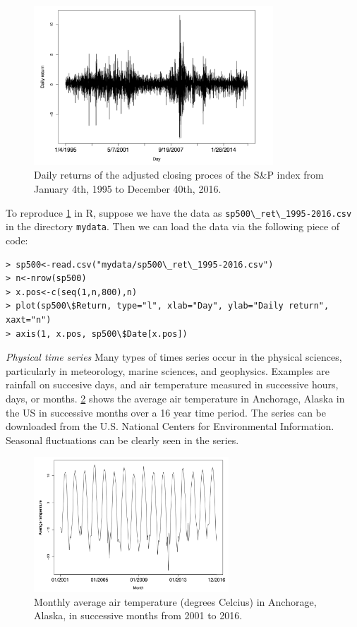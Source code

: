 \begin{figure}[ht]
	\centering
	\includegraphics[width=0.8\textwidth]{Chapter 1/fig1-2.png}
	\caption{Daily returns of the adjusted closing proces of the S\&P index from January 4th, 1995 to December 40th, 2016.}
	\label{fig:1.2}
\end{figure}

To reproduce \cref{fig:1.2} in R, suppose we have the data as \lstinline{sp500\_ret\_1995-2016.csv} in the directory \lstinline{mydata}. Then we can load the data via the following piece of code:

\begin{verbatim}
> sp500<-read.csv("mydata/sp500\_ret\_1995-2016.csv")
> n<-nrow(sp500)
> x.pos<-c(seq(1,n,800),n)
> plot(sp500\$Return, type="l", xlab="Day", ylab="Daily return", xaxt="n")
> axis(1, x.pos, sp500\$Date[x.pos])
\end{verbatim}

\textit{Physical time series}
Many types of times series occur in the physical sciences, particularly in meteorology, marine sciences, and geophysics. Examples are rainfall on succesive days, and air temperature measured in successive hours, days, or months. \cref{fig:1.3} shows the average air temperature in Anchorage, Alaska in the US in successive months over a 16 year time period. The series can be downloaded from the U.S. National Centers for Environmental Information. Seasonal fluctuations can be clearly seen in the series.

\begin{figure}[h]
	\centering
	\includegraphics[width=0.65\textwidth]{Chapter 1/fig1-3.png}
	\caption{Monthly average air temperature (degrees Celcius) in Anchorage, Alaska, in successive months from 2001 to 2016.}
	\label{fig:1.3}
\end{figure}

